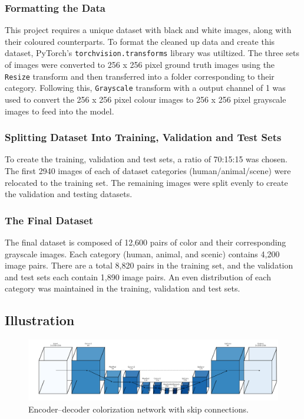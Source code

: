 \documentclass{article} %
\begin{document}
\subsubsection{Formatting the Data}

This project requires a unique dataset with black and white images, along with their coloured counterparts. To format the cleaned up data and create this dataset, PyTorch’s \verb|torchvision.transforms| library was utiltized. The three sets of images were converted to 256 x 256 pixel ground truth images using the \verb|Resize| transform and then transferred into a folder corresponding to their category. Following this, \verb|Grayscale|
 transform with a output channel of 1 was used to convert the 256 x 256 pixel colour images to 256 x 256 pixel grayscale images to feed into the model. 

 \subsubsection{Splitting Dataset Into Training, Validation and Test Sets}

To create the training, validation and test sets, a ratio of 70:15:15 was chosen. The first 2940 images of each of dataset categories (human/animal/scene) were relocated to the training set. The remaining images were split evenly to create the validation and testing datasets. 

\subsubsection{The Final Dataset}

The final dataset is composed of 12,600 pairs of color and their corresponding grayscale images. Each category (human, animal, and scenic) contains 4,200 image pairs. There are a total 8,820 pairs in the training set, and the validation and test sets each contain 1,890 image pairs. An even distribution of each category was maintained in the training, validation and test sets.

\subsection{Illustration}

\begin{figure}[htbp]            %
  \centering
  \includegraphics[width=0.9\linewidth]{Figs/architecture.png}
  \caption{Encoder–decoder colorization network with skip connections.}
  \label{fig:architecture}
\end{figure}
\end{document}
